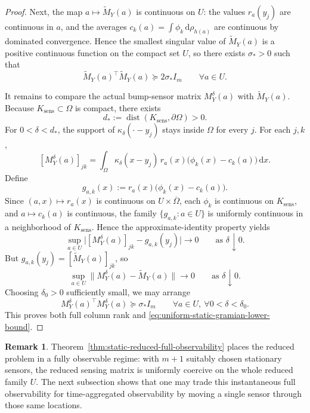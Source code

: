 \documentclass{article}
\theoremstyle{definition}
\newtheorem{remark}[theorem]{Remark}
\DeclareMathOperator{\dist}{dist}
\renewcommand{\d}{\mathrm{d}}
\begin{document}
\begin{proof}
    Next, the map \(a\mapsto \widetilde M_Y(a)\) is continuous on \(U\): the values \(r_a(y_j)\) are
    continuous in \(a\), and the averages \(c_k(a)=\int \phi_k\,\d\rho_{h(a)}\) are continuous by
    dominated convergence. Hence the smallest singular value of \(\widetilde M_Y(a)\) is a positive
    continuous function on the compact set \(U\), so there exists \(\sigma_*>0\) such that
    \[
        \widetilde M_Y(a)^\top \widetilde M_Y(a)\succeq 2\sigma_* I_m
        \qquad
        \forall a\in U.
    \]

    It remains to compare the actual bump-sensor matrix \(M_Y^\delta(a)\) with
    \(\widetilde M_Y(a)\). Because \(K_{\mathrm{sens}}\subset\Omega\) is compact, there exists
    \[
        d_*:=\dist(K_{\mathrm{sens}},\partial\Omega)>0.
    \]
    For \(0<\delta<d_*\), the support of \(\kappa_\delta(\cdot-y_j)\) stays inside \(\Omega\) for every
    \(j\). For each \(j,k\),
    \[
        [M_Y^\delta(a)]_{jk}
        =
        \int_\Omega \kappa_\delta(x-y_j)\,r_a(x)\bigl(\phi_k(x)-c_k(a)\bigr)\,\d x.
    \]
    Define
    \[
        g_{a,k}(x):=r_a(x)\bigl(\phi_k(x)-c_k(a)\bigr).
    \]
    Since \((a,x)\mapsto r_a(x)\) is continuous on \(U\times\overline\Omega\), each \(\phi_k\) is
    continuous on \(K_{\mathrm{sens}}\), and \(a\mapsto c_k(a)\) is continuous, the family
    \(\{g_{a,k}:a\in U\}\) is uniformly continuous in a neighborhood of \(K_{\mathrm{sens}}\). Hence the
    approximate-identity property yields
    \[
        \sup_{a\in U}\bigl|[M_Y^\delta(a)]_{jk}-g_{a,k}(y_j)\bigr|\longrightarrow 0
        \qquad\text{as }\delta\downarrow 0.
    \]
    But \(g_{a,k}(y_j)=[\widetilde M_Y(a)]_{jk}\), so
    \[
        \sup_{a\in U}\|M_Y^\delta(a)-\widetilde M_Y(a)\|\longrightarrow 0
        \qquad\text{as }\delta\downarrow 0.
    \]
    Choosing \(\delta_0>0\) sufficiently small, we may arrange
    \[
        M_Y^\delta(a)^\top M_Y^\delta(a)\succeq \sigma_* I_m
        \qquad
        \forall a\in U,\ \forall 0<\delta<\delta_0.
    \]
    This proves both full column rank and \eqref{eq:uniform-static-gramian-lower-bound}.
\end{proof}

\begin{remark}
    \label{rem:localized-sensor-fully-observable-special-case}
    Theorem~\ref{thm:static-reduced-full-observability} places the reduced problem in a fully
    observable regime: with \(m+1\) suitably chosen stationary sensors, the reduced sensing matrix is
    uniformly coercive on the whole reduced family \(U\). The next subsection shows that one may
    trade this instantaneous full observability for time-aggregated observability by moving a single
    sensor through those same locations.
\end{remark}
\end{document}
